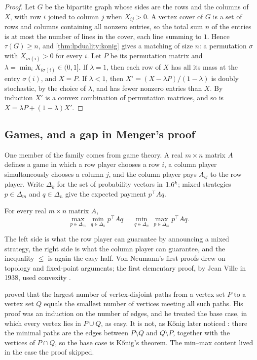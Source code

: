 \begin{refsection}
\begin{proof}
Let $G$ be the bipartite graph whose sides are the rows and the columns of $X$, with row $i$ joined to column $j$ when $X_{ij}>0$. A vertex cover of $G$ is a set of rows and columns containing all nonzero entries, so the total sum $n$ of the entries is at most the number of lines in the cover, each line summing to $1$. Hence $\tau(G)\ge n$, and \cref{thm:lpduality:konig} gives a matching of size $n$: a permutation $\sigma$ with $X_{i\sigma(i)}>0$ for every $i$. Let $P$ be its permutation matrix and $\lambda=\min_i X_{i\sigma(i)}\in(0,1]$. If $\lambda=1$, then each row of $X$ has all its mass at the entry $\sigma(i)$, and $X=P$. If $\lambda<1$, then $X'=(X-\lambda P)/(1-\lambda)$ is doubly stochastic, by the choice of $\lambda$, and has fewer nonzero entries than $X$. By induction $X'$ is a convex combination of permutation matrices, and so is $X=\lambda P+(1-\lambda)X'$.
\end{proof}

\subsection{Games, and a gap in Menger's proof}

One member of the family comes from game theory. A real $m\times n$ matrix $A$ defines a game in which a row player chooses a row $i$, a column player simultaneously chooses a column $j$, and the column player pays $A_{ij}$ to the row player. Write $\Delta_k$ for the set of probability vectors in $1.6^k$; mixed strategies $p\in\Delta_m$ and $q\in\Delta_n$ give the expected payment $p^\top Aq$.

\begin{theorem}\label{thm:lpduality:minimax}
For every real $m\times n$ matrix $A$,
\[
\max_{p\in\Delta_m}\,\min_{q\in\Delta_n} p^\top Aq=\min_{q\in\Delta_n}\,\max_{p\in\Delta_m} p^\top Aq .
\]
\end{theorem}

The left side is what the row player can guarantee by announcing a mixed strategy, the right side is what the column player can guarantee, and the inequality $\le$ is again the easy half. Von Neumann's first proofs drew on topology and fixed-point arguments; the first elementary proof, by Jean Ville in 1938, used convexity \parencite{Ville1938,Kjeldsen2001}.

\begin{aside}
\textcite{Menger1927} proved that the largest number of vertex-disjoint paths from a vertex set $P$ to a vertex set $Q$ equals the smallest number of vertices meeting all such paths. His proof was an induction on the number of edges, and he treated the base case, in which every vertex lies in $P\cup Q$, as easy. It is not, as K\H{o}nig later noticed \parencite{Schrijver2005}: there the minimal paths are the edges between $P\setminus Q$ and $Q\setminus P$, together with the vertices of $P\cap Q$, so the base case is K\H{o}nig's theorem. The min--max content lived in the case the proof skipped.
\end{aside}


\end{refsection}

